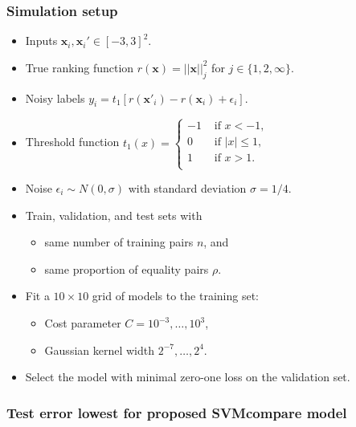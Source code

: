 \documentclass{beamer}
\begin{document}
\begin{frame}
  \frametitle{Simulation setup}
  \begin{itemize}
    \item Inputs $\mathbf x_i,\mathbf x_i'\in[-3,3]^2$.
    \item True ranking function $r(\mathbf x)=||\mathbf x||^2_j$ 
      for $j\in\{1,2,\infty\}$.
    \item Noisy labels $y_i=t_1[r(\mathbf x'_i)-r(\mathbf x_i)+\epsilon_i]$.
  \item Threshold function
$
  \label{eq:threshold}
  t_1(x) = 
  \begin{cases}
    -1 & \text{ if } x < -1, \\
    0 & \text{ if } |x| \leq 1, \\
    1 & \text{ if } x > 1. \\
  \end{cases}
$
\item Noise $\epsilon_i\sim N(0, \sigma)$ with standard deviation
  $\sigma=1/4$.
\item Train, validation, and test sets with
  \begin{itemize}
    \item same number of training pairs $n$, and
    \item same proportion of equality pairs $\rho$.
  \end{itemize}
\item Fit a $10\times 10$ grid of models to the training
set:
\begin{itemize}
\item Cost parameter $C=10^{-3},\dots,10^3$,
\item Gaussian kernel width $2^{-7},\dots,2^4$.
\end{itemize}
\item Select the model with minimal zero-one loss on the validation set.
  \end{itemize}
\end{frame}



\begin{frame}
  \frametitle{Test error lowest for proposed SVMcompare model}
  \begin{minipage}{1.0\linewidth}
    \hskip -0.5cm
      
  \end{minipage}
\end{frame}


\end{document}
